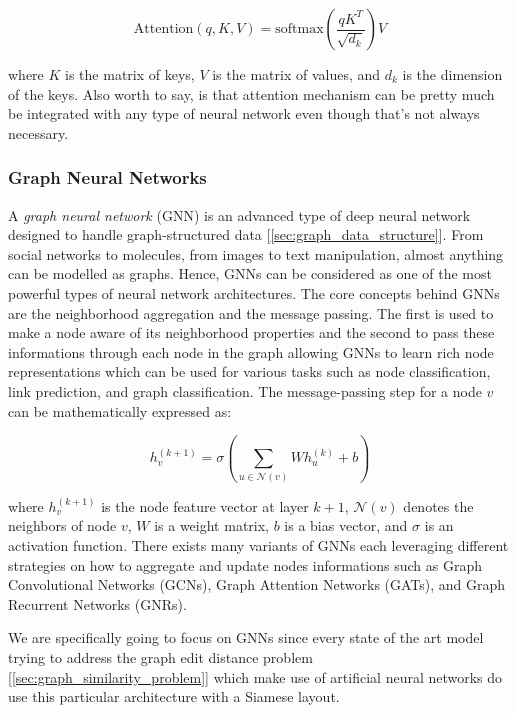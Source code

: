 \documentclass[../Thesis.tex]{subfiles}
\begin{document}
	\[
	\text{Attention}(q, K, V) = \text{softmax} \left( \frac{qK^T}{\sqrt{d_k}} \right) V
	\]
	
	where \(K\) is the matrix of keys, \(V\) is the matrix of values, and \(d_k\) is the dimension of the keys. Also worth to say, is that attention mechanism can be pretty much be integrated with any type of neural network even though that's not always necessary.
	
	
	
	
	\subsubsection{Graph Neural Networks}
	A \emph{graph neural network} (GNN) is an advanced type of deep neural network designed to handle graph-structured data [\autoref{sec:graph_data_structure}]. From social networks to molecules, from images to text manipulation, almost anything can be modelled as graphs. Hence, GNNs can be considered as one of the most powerful types of neural network architectures. The core concepts behind GNNs are the neighborhood aggregation and the message passing. The first is used to make a node aware of its neighborhood properties and the second to pass these informations through each node in the graph allowing GNNs to learn rich node representations which can be used for various tasks such as node classification, link prediction, and graph classification. The message-passing step for a node \(v\) can be mathematically expressed as:
	
	\[
	h_v^{(k+1)} = \sigma \left( \sum_{u \in \mathcal{N}(v)} W h_u^{(k)} + b \right)
	\]
	
	where \(h_v^{(k+1)}\) is the node feature vector at layer \(k+1\), \(\mathcal{N}(v)\) denotes the neighbors of node \(v\), \(W\) is a weight matrix, \(b\) is a bias vector, and \(\sigma\) is an activation function. There exists many variants of GNNs each leveraging different strategies on how to aggregate and update nodes informations such as Graph Convolutional Networks (GCNs), Graph Attention Networks (GATs), and Graph Recurrent Networks (GNRs).
	
	
	
	We are specifically going to focus on GNNs since every state of the art model trying to address the graph edit distance problem [\autoref{sec:graph_similarity_problem}] which make use of artificial neural networks do use this particular architecture with a Siamese layout.
	
\end{document}
